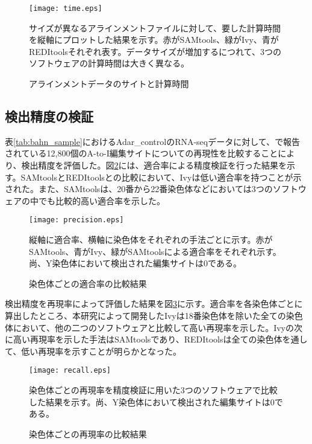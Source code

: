 \begin{figure}[!ht]
	\begin{center}
		\texttt{[image: time.eps]}
	\end{center}
	\caption{アラインメントデータのサイトと計算時間}
	\begin{flushleft}
		\small{サイズが異なるアラインメントファイルに対して、要した計算時間を縦軸にプロットした結果を示す。赤がSAMtools、緑がIvy、青がREDItoolsそれぞれ表す。データサイズが増加するにつれて、3つのソフトウェアの計算時間は大きく異なる。}
	\end{flushleft}
	\label{fig:mesured_time}
\end{figure}

\subsection{検出精度の検証}
表\ref{tab:bahn_sample}におけるAdar\_controlのRNA-seqデータに対して、\cite{BahLeeLi1201}で報告されている12,800個のA-to-I編集サイトについての再現性を比較することにより、検出精度を評価した。図\ref{fig:precision}には、適合率による精度検証を行った結果を示す。SAMtoolsとREDItoolsとの比較において、Ivyは低い適合率を持つことが示された。また、SAMtoolsは、20番から22番染色体などにおいては3つのソフトウェアの中でも比較的高い適合率を示した。
\begin{figure}[!ht]
	\begin{center}
		\texttt{[image: precision.eps]}
	\end{center}
	\caption{染色体ごとの適合率の比較結果}
	\begin{flushleft}
		\small{縦軸に適合率、横軸に染色体をそれぞれの手法ごとに示す。赤がSAMtools、青がIvy、緑がSAMtoolsによる適合率をそれぞれ示す。尚、Y染色体において検出された編集サイトは0である。}
	\end{flushleft}
	\label{fig:precision}
\end{figure}

検出精度を再現率によって評価した結果を図\ref{fig:recall}に示す。適合率を各染色体ごとに算出したところ、本研究によって開発したIvyは18番染色体を除いた全ての染色体において、他の二つのソフトウェアと比較して高い再現率を示した。Ivyの次に高い再現率を示した手法はSAMtoolsであり、REDItoolsは全ての染色体を通して、低い再現率を示すことが明らかとなった。

\begin{figure}[!ht]
	\begin{center}
		\texttt{[image: recall.eps]}
	\end{center}
	\caption{染色体ごとの再現率の比較結果}
	\begin{flushleft}
		\small{染色体ごとの再現率を精度検証に用いた3つのソフトウェアで比較した結果を示す。尚、Y染色体において検出された編集サイトは0である。}
	\end{flushleft}
	\label{fig:recall}
\end{figure}

